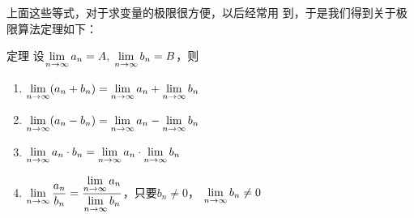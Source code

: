 上面这些等式，对于求变量的极限很方便，以后经常用
到，于是我们得到关于极限算法定理如下：

\begin{blk}{定理}
设$\displaystyle\lim_{n\to\infty}a_n=A,\; \displaystyle\lim_{n\to\infty}b_n=B$，则
\begin{enumerate}
    \item $\displaystyle\lim_{n\to\infty}(a_n+b_n)=\displaystyle\lim_{n\to\infty}a_n+\displaystyle\lim_{n\to\infty}b_n$
    \item $\displaystyle\lim_{n\to\infty}(a_n-b_n)=\displaystyle\lim_{n\to\infty}a_n-\displaystyle\lim_{n\to\infty}b_n$
    \item $\displaystyle\lim_{n\to\infty}a_n\cdot b_n=\displaystyle\lim_{n\to\infty}a_n\cdot \displaystyle\lim_{n\to\infty}b_n$
    \item $\displaystyle\lim_{n\to\infty}\dfrac{a_n}{b_n}=\dfrac{\displaystyle\lim_{n\to\infty}a_n}{\displaystyle\lim_{n\to\infty}b_n}$，只要$b_n\ne 0$， $\displaystyle\lim_{n\to\infty}b_n\ne 0$
\end{enumerate}
 \end{blk}


